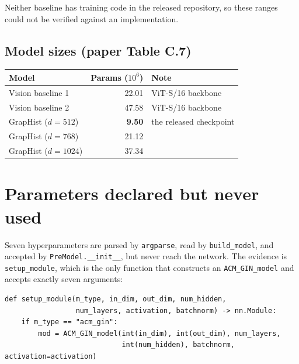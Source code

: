 \documentclass[10pt,a4paper]{article}
\begin{document}
\noindent Neither baseline has training code in the released repository, so these
ranges could not be verified against an implementation.

\subsection{Model sizes (paper Table C.7)}

\begin{longtable}{@{}p{5.0cm}r p{8.2cm}@{}}
\toprule
\textbf{Model} & \textbf{Params ($10^6$)} & \textbf{Note} \\
\midrule \endhead
Vision baseline 1 & 22.01 & ViT-S/16 backbone \\
Vision baseline 2 & 47.58 & ViT-S/16 backbone \\
GrapHist ($d = 512$) & \textbf{9.50} & the released checkpoint \\
GrapHist ($d = 768$) & 21.12 & \\
GrapHist ($d = 1024$) & 37.34 & \\
\bottomrule
\end{longtable}

\newpage
\section{Parameters declared but never used}
\label{sec:dead}

Seven hyperparameters are parsed by \texttt{argparse}, read by
\texttt{build\_model}, and accepted by \texttt{PreModel.\_\_init\_\_}, but never
reach the network. The evidence is \texttt{setup\_module}, which is the only
function that constructs an \texttt{ACM\_GIN\_model} and accepts exactly seven
arguments:

\begin{verbatim}
def setup_module(m_type, in_dim, out_dim, num_hidden,
                 num_layers, activation, batchnorm) -> nn.Module:
    if m_type == "acm_gin":
        mod = ACM_GIN_model(int(in_dim), int(out_dim), num_layers,
                            int(num_hidden), batchnorm, activation=activation)
\end{verbatim}
\end{document}
